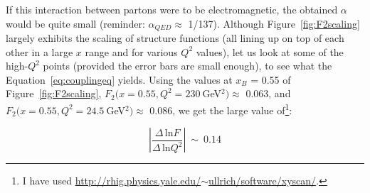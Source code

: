 If this interaction between partons were to be electromagnetic, the
obtained $\alpha$ would be quite small (reminder: $\alpha_{QED}\approx$
1/137). Although Figure~\ref{fig:F2scaling} largely exhibits the
scaling of structure functions (all lining up on top of each other in
a large $x$ range and for various $Q^2$ values), let us look at
some of the high-$Q^{2}$ points (provided the error bars are small
enough), to see what the Equation~\ref{eq:couplingeq} yields. Using the values at $x_{B}$ =
0.55 of Figure~\ref{fig:F2scaling}, $F_{2}(x=0.55, Q^{2}=230~$GeV$^{2})\approx$ 0.063, and $F_{2}(x=0.55, Q^{2}=24.5~$GeV$^{2})\approx$ 0.086, we get the large value of\footnote{I have used
  \href{http://rhig.physics.yale.edu/~ullrich/software/xyscan/}{http://rhig.physics.yale.edu/$\sim$ullrich/software/xyscan/}.}: 

\begin{equation}
\left| \frac{\Delta\,\textrm{ln}F}{\Delta\,\textrm{ln}Q^{2}} \right|
\:\sim\: 0.14
\end{equation}

\vspace{0.5em}
\begin{center}
\end{center}






